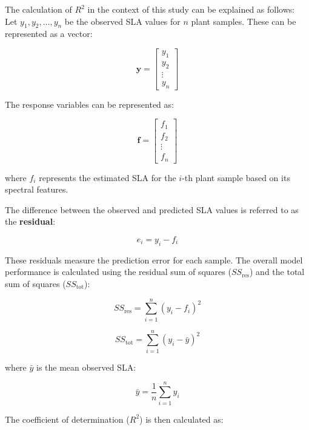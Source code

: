 \documentclass[12pt,a4paper]{report}
\begin{document}
The calculation of $R^2$ in the context of this study can be explained as follows: \\

Let \( y_1, y_2, \dots, y_n \) be the observed SLA values for \( n \) plant samples. These can be represented as a vector:

\[
\mathbf{y} = \begin{bmatrix} y_1 \\ y_2 \\ \vdots \\ y_n \end{bmatrix}
\]

The response variables can be represented as:

\[
\mathbf{f} = \begin{bmatrix} f_1 \\ f_2 \\ \vdots \\ f_n \end{bmatrix}
\]

where \( f_i \) represents the estimated SLA for the \( i \)-th plant sample based on its spectral features.


The difference between the observed and predicted SLA values is referred to as the \textbf{residual}:

\begin{equation}
   e_i = y_i - f_i 
\end{equation}



These residuals measure the prediction error for each sample. The overall model performance is calculated using the residual sum of squares (\( SS_{\text{res}} \)) and the total sum of squares (\( SS_{\text{tot}} \)):

\begin{equation}
   SS_{\text{res}} = \sum_{i=1}^{n} (y_i - f_i)^2 
\end{equation}


\begin{equation}
    SS_{\text{tot}} = \sum_{i=1}^{n} (y_i - \bar{y})^2
\end{equation}


where \( \bar{y} \) is the mean observed SLA:

\begin{equation}
    \bar{y} = \frac{1}{n} \sum_{i=1}^{n} y_i
\end{equation}


The coefficient of determination (\( R^2 \)) is then calculated as:
\end{document}
